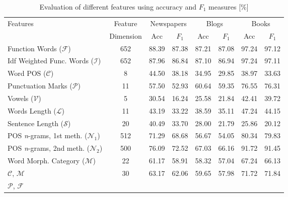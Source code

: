 \documentclass{llncs}
\begin{document}
\begin{table*}[htb]
\normalsize\caption{Evaluation of different features using accuracy and $F_1$ measures [\%]}
\scriptsize
\centering
\begin{tabular}{l c c c c c c c}%
\toprule%
Features & Feature & \multicolumn{2}{c}{Newspapers} &
\multicolumn{2}{c}{Blogs} & \multicolumn{2}{c}{Books}\\ & Dimension &
\hspace{5pt} Acc \hspace{5pt} & \hspace{5pt} $F_1$ \hspace{5pt} & \hspace{5pt} Acc \hspace{5pt} & \hspace{5pt} $F_1$ \hspace{5pt} & \hspace{5pt} Acc \hspace{5pt} & \hspace{5pt} $F_1$ \hspace{5pt}\\
\midrule
Function Words ($\mathcal{F}$) & 652 & 88.39 & 87.38 & 87.21 & 87.08 & 97.24 &
97.12 \\ Idf Weighted Func. Words ($\mathcal{I}$) & 652 & 87.96 & 86.84 & 87.10
& 86.94 & 97.24 & 97.11 \\ Word POS ($\mathcal{C}$) & 8 & 44.50 & 38.18 & 34.95
& 29.85 & 38.97 & 33.63 \\ Punctuation Marks ($\mathcal{P}$) & 11 & 57.50 &
52.93 & 60.64 & 59.35 & 76.55 & 76.31 \\ Vowels ($\mathcal{V}$) & 5 & 30.54 & 16.24 &
25.58 & 21.84 & 42.41 & 39.72 \\ Words Length ($\mathcal{L}$) & 11 & 43.19 &
33.22 & 38.59 & 35.11 & 47.24 & 44.15 \\ Sentence Length ($\mathcal{S}$) & 20 &
40.49 & 33.70 & 28.00 & 21.79 & 25.86 & 20.12 \\ POS \emph{n}-grams, 1st
meth. ($\mathcal{N}_1$) & 512 & 71.29 & 68.68 & 56.67 & 54.05 & 80.34 & 79.83 \\
POS \emph{n}-grams, 2nd meth. ($\mathcal{N}_2$) & 500 & 76.09 & 72.52 & 67.03 &
66.16 & 91.72 & 91.45 \\ Word Morph. Category ($\mathcal{M}$) & 22 & 61.17
& 58.91 & 58.32 & 57.04 & 67.24 & 66.13 \\ $\mathcal{C}$, $\mathcal{M}$ & 30 &
63.17 & 62.06 & 59.65 & 57.98 & 71.72 & 71.84 \\ $\mathcal{P}$, $\mathcal{F}$ &

\end{tabular}
\end{table*}
\end{document}
